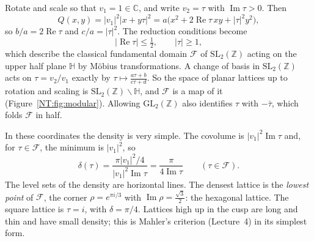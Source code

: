 \documentclass[11pt,openany]{book}
\theoremstyle{plain}
\theoremstyle{definition}
\theoremstyle{remark}
\newcommand{\Z}{\mathbb{Z}}
\newcommand{\C}{\mathbb{C}}
\newcommand{\GL}{\mathrm{GL}}
\newcommand{\SL}{\mathrm{SL}}
\newcommand{\abs}[1]{\left\lvert #1 \right\rvert}
\newcommand{\dens}{\delta}             %
\begin{document}
Rotate and scale so that $v_1=1\in\C$, and write $v_2=\tau$ with $\operatorname{Im}\tau>0$. Then
\[
  Q(x,y)=\abs{v_1}^2\abs{x+y\tau}^2=a\big(x^2+2\operatorname{Re}\tau\,xy+\abs\tau^2y^2\big),
\]
so $b/a=2\operatorname{Re}\tau$ and $c/a=\abs\tau^2$. The reduction conditions become
\[
  \abs{\operatorname{Re}\tau}\le\tfrac12,\qquad \abs\tau\ge1 ,
\]
which describe the classical fundamental domain $\mathcal F$ of $\SL_2(\Z)$ acting on the upper half
plane $\mathbb H$ by M\"obius transformations. A change of basis in $\SL_2(\Z)$ acts on $\tau=v_2/v_1$
exactly by $\tau\mapsto\frac{a\tau+b}{c\tau+d}$. So the space of planar lattices up to rotation and
scaling is $\SL_2(\Z)\backslash\mathbb H$, and $\mathcal F$ is a map of it (Figure~\ref{NT:fig:modular}).
Allowing $\GL_2(\Z)$ also identifies $\tau$ with $-\bar\tau$, which folds $\mathcal F$ in half.

In these coordinates the density is very simple. The covolume is $\abs{v_1}^2\operatorname{Im}\tau$ and,
for $\tau\in\mathcal F$, the minimum is $\abs{v_1}^2$, so
\[
  \dens(\tau)=\frac{\pi\abs{v_1}^2/4}{\abs{v_1}^2\operatorname{Im}\tau}=\frac{\pi}{4\operatorname{Im}\tau}
  \qquad(\tau\in\mathcal F).
\]
The level sets of the density are horizontal lines. The densest lattice is the \emph{lowest point} of
$\mathcal F$, the corner $\rho=e^{\pi i/3}$ with $\operatorname{Im}\rho=\frac{\sqrt3}{2}$: the hexagonal
lattice. The square lattice is $\tau=i$, with $\dens=\pi/4$. Lattices high up in the cusp are long and
thin and have small density; this is Mahler's criterion (Lecture~4) in its simplest form.
\end{document}
